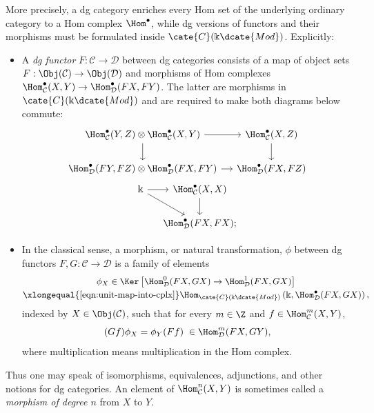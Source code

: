 More precisely, a dg category enriches every Hom set of the underlying
ordinary category to a Hom complex $\Hom^\bullet$, while dg versions of
functors and their morphisms must be formulated inside
$\cate{C}(\Bbbk\dcate{Mod})$. Explicitly:
\begin{itemize}
	\item A \emph{dg functor} $F:\mathcal{C}\to\mathcal{D}$ between dg
	categories consists of a map of object sets
	$F:\Obj(\mathcal{C})\to\Obj(\mathcal{D})$ and morphisms of Hom complexes
	$\Hom^\bullet_{\mathcal{C}}(X,Y)\to
	\Hom^\bullet_{\mathcal{D}}(FX,FY)$. The latter are morphisms in
	$\cate{C}(\Bbbk\dcate{Mod})$ and are required to make both diagrams below
	commute:
	\begin{equation*}\begin{gathered}
		\begin{tikzcd}[column sep=small]
			\Hom_{\mathcal{C}}^\bullet(Y, Z) \otimes \Hom_{\mathcal{C}}^\bullet(X, Y) \arrow[r] \arrow[d] & \Hom_{\mathcal{C}}^\bullet(X, Z) \arrow[d] \\
			\Hom_{\mathcal{D}}^\bullet(FY, FZ) \otimes \Hom_{\mathcal{D}}^\bullet(FX, FY) \arrow[r] & \Hom_{\mathcal{D}}^\bullet(FX, FZ)
		\end{tikzcd} \\
		\begin{tikzcd}[column sep=small]
			\Bbbk \arrow[r] \arrow[rd] & \Hom_{\mathcal{C}}^\bullet(X, X) \arrow[d] \\
			& \Hom_{\mathcal{D}}^\bullet(FX, FX) ;
		\end{tikzcd}
	\end{gathered}\end{equation*}
	\item In the classical sense, a morphism, or natural transformation,
	$\phi$ between dg functors $F,G:\mathcal{C}\to\mathcal{D}$ is a family of
	elements
	\begin{multline*}
		\phi_X \in \Ker\left[ \Hom_{\mathcal{D}}^0(FX, GX) \to \Hom_{\mathcal{D}}^1(FX, GX) \right] \\
		\xlongequal{\text{\eqref{eqn:unit-map-into-cplx}}} \Hom_{\cate{C}(\Bbbk\dcate{Mod})}\left(\Bbbk, \Hom_{\mathcal{D}}^\bullet(FX, GX) \right) ,
	\end{multline*}
	indexed by $X\in\Obj(\mathcal{C})$, such that for every $m\in\Z$ and
	$f\in\Hom_{\mathcal{C}}^m(X,Y)$,
	\[ (Gf) \phi_X = \phi_Y (Ff) \; \in \Hom_{\mathcal{D}}^m(FX, GY), \]
	where multiplication means multiplication in the Hom complex.
\end{itemize}
Thus one may speak of isomorphisms, equivalences, adjunctions, and other
notions for dg categories. An element of $\Hom^n_{\mathcal{C}}(X,Y)$ is
sometimes called a \emph{morphism of degree $n$} from $X$ to $Y$.

